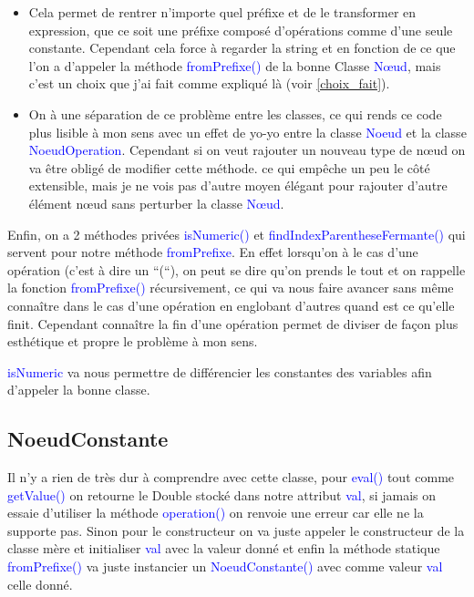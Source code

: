 \documentclass[a4paper]{article}
\renewcommand{\texttt}[2][blue]{\textcolor{#1}{\ttfamily #2}}
\begin{document}
\begin{itemize}
\item Cela permet de rentrer n'importe quel préfixe et de le transformer en expression, que ce soit une préfixe composé d'opérations comme d'une seule constante. Cependant cela force à regarder la string et en fonction de ce que l'on a d'appeler la méthode \texttt{fromPrefixe()} de la bonne Classe \texttt{Nœud}, mais c'est un choix que j'ai fait comme expliqué là (voir \ref{choix_fait}).

\item On à une séparation de ce problème entre les classes, ce qui rends ce code plus lisible à mon sens avec un effet de yo-yo entre la classe \texttt{Noeud} et la classe \texttt{NoeudOperation}. Cependant si on veut rajouter un nouveau type de nœud on va être obligé de modifier cette méthode. ce qui empêche un peu le côté extensible, mais je ne vois pas d'autre moyen élégant pour rajouter d'autre élément nœud sans perturber la classe \texttt{Nœud}.
  
\end{itemize}

\vspace{0.5cm}

Enfin, on a 2 méthodes privées \texttt{isNumeric()} et \texttt{findIndexParentheseFermante()} qui servent pour notre méthode \texttt{fromPrefixe}. En effet lorsqu'on à le cas d'une opération (c'est à dire un ``(``), on peut se dire qu'on prends le tout et on rappelle la fonction \texttt{fromPrefixe()} récursivement, ce qui va nous faire avancer sans même connaître dans le cas d'une opération en englobant d'autres quand est ce qu'elle finit. Cependant connaître la fin d'une opération permet de diviser de façon plus esthétique et propre le problème à mon sens.

\texttt{isNumeric} va nous permettre de différencier les constantes des variables afin d'appeler la bonne classe. 

\subsection{NoeudConstante}
\label{subsec:noeud_const}

Il n'y a rien de très dur à comprendre avec cette classe, pour \texttt{eval()} tout comme \texttt{getValue()} on retourne le Double stocké dans notre attribut \texttt{val}, si jamais on essaie d'utiliser la méthode \texttt{operation()} on renvoie une erreur car elle ne la supporte pas. Sinon pour le constructeur on va juste appeler le constructeur de la classe mère et initialiser \texttt{val} avec la valeur donné et enfin la méthode statique \texttt{fromPrefixe()} va juste instancier un \texttt{NoeudConstante()} avec comme valeur \texttt{val} celle donné. 
\end{document}
